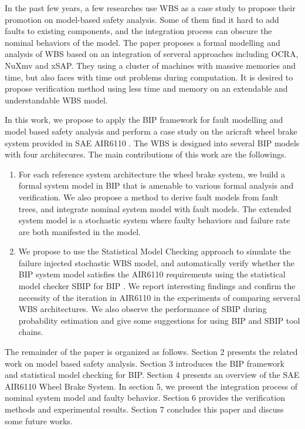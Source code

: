 In the past few years, a few researches use WBS as a case study to propose their promotion on model-based safety analysis.
 Some of them find it hard to add faults to existing components, and the integration process can obscure the nominal behaviors of the model. 
 The paper\cite{cav15} proposes a formal modelling and analysis of WBS based on an integration of serveral approaches including OCRA, NuXmv and xSAP. 
 They using a cluster of machines with massive memories and time, but also faces with time out problems during computation. 
 It is desired to propose verification method using less time and memory on an extendable and understandable WBS model.


In this work, we propose to apply the BIP framework for fault modelling and model based safety analysis 
 and perform a case study on the aricraft wheel brake system provided in SAE AIR6110  \cite{air6110}.
 The WBS is designed into several BIP models with four architecures. 
 The main contributions of this work are the followings.

\begin{enumerate}
\item For each reference system architecture the wheel brake system,  we build a formal system model in BIP that is amenable to various formal analysis and verification.
 We also propose a method to derive fault models from fault trees, and integrate nominal system model with fault models. 
 The extended system model is a stochastic system where faulty behaviors and failure rate are both manifested in the model.

\item We propose to use the Statistical Model Checking\cite{vmcai04}\cite{cav04}\cite{cmu04} approach to simulate the failure injected stochastic WBS model,
 and automatically verify whether the BIP system model satisfies the AIR6110 requirements using the statistical model checker SBIP for BIP \cite{sbip18}.
 We report interesting findings and confirm the necessity of the iteration in AIR6110 in the experiments of comparing serveral WBS architectures. 
 We also observe the performance of SBIP during probability estimation and give some suggestions for using BIP and SBIP tool chains.
\end{enumerate}

The remainder of the paper is organized as follows. 
Section 2 presents the related work on model based safety analysis.
Section 3 introduces the BIP framework and statistical model checking for BIP.
Section 4 presents an overview of the SAE AIR6110 Wheel Brake System.
In section 5, we present the integration process of nominal system model and faulty behavior.
Section 6 provides the verification methods and experimental results.
Section 7 concludes this paper and discuss some future works.
